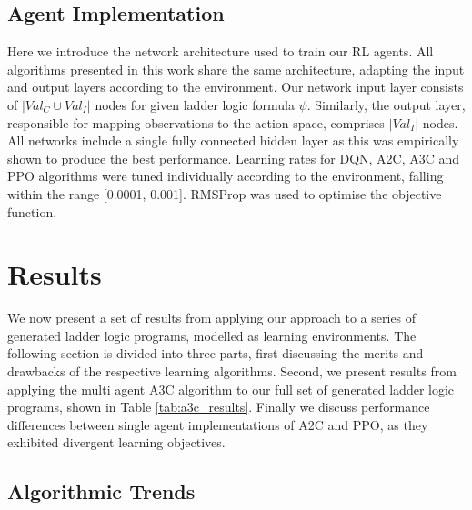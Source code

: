\documentclass[runningheads]{llncs}
\begin{document}
\subsection{Agent Implementation}
Here we introduce the network architecture used to train our RL agents. All algorithms presented in this work share the same architecture, adapting the input and output layers according to the environment. Our network input layer consists of $|Val_C \cup Val_I|$ nodes for given ladder logic formula $\psi$. Similarly, the output layer, responsible for mapping observations to the action space, comprises $|Val_I|$ nodes. All networks include a single fully connected hidden layer as this was empirically shown to produce the best performance. Learning rates for DQN, A2C, A3C and PPO algorithms were tuned individually according to the environment, falling within the range [0.0001, 0.001]. RMSProp was used to optimise the objective function.

\section{Results}\label{sec:results}
We now present a set of results from applying our approach to a series of generated ladder logic programs, modelled as learning environments. The following section is divided into three parts, first discussing the merits and drawbacks of the respective learning algorithms. Second, we present results from applying the multi agent A3C algorithm to our full set of generated ladder logic programs, shown in Table \ref{tab:a3c_results}. Finally we discuss performance differences between single agent implementations of A2C and PPO, as they exhibited divergent learning objectives.


\subsection{Algorithmic Trends}\label{sec:algorithmic_trends}
\end{document}
